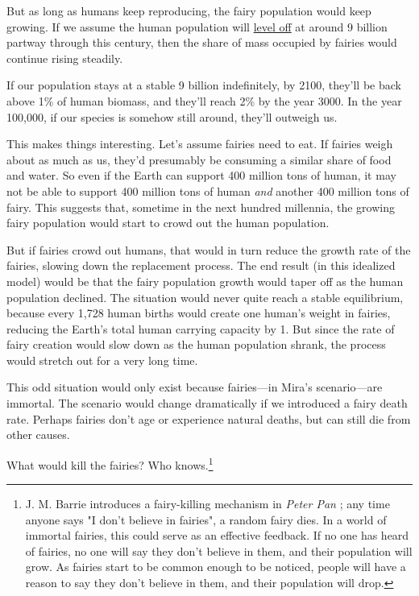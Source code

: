 {{But as long as humans keep reproducing, the fairy population would keep growing. If we assume the human population will \href{http://www.un.org/esa/population/publications/longrange2/WorldPop2300final.pdf}{level off} at around 9 billion partway through this century, then the share of mass occupied by fairies would continue rising steadily.}

{If our population stays at a stable 9 billion indefinitely, by 2100, they'll be back above 1\% of human biomass, and they'll reach 2\% by the year 3000. In the year 100,000, if our species is somehow still around, they'll outweigh us.}

{This makes things interesting. Let's assume fairies need to eat. If fairies weigh about as much as us, they'd presumably be consuming a similar share of food and water. So even if the Earth can support 400 million tons of human, it may not be able to support 400 million tons of human \emph{and} another 400 million tons of fairy. This suggests that, sometime in the next hundred millennia, the growing fairy population would start to crowd out the human population.}

{But if fairies crowd out humans, that would in turn reduce the growth rate of the fairies, slowing down the replacement process. The end result (in this idealized model) would be that the fairy population growth would taper off as the human population declined. The situation would never quite reach a stable equilibrium, because every 1,728 human births would create one human's weight in fairies, reducing the Earth's total human carrying capacity by 1. But since the rate of fairy creation would slow down as the human population shrank, the process would stretch out for a very long time.}

{This odd situation would only exist because fairies—in Mira's scenario—are immortal. The scenario would change dramatically if we introduced a fairy death rate. Perhaps fairies don't age or experience natural deaths, but can still die from other causes.}

{What would kill the fairies? Who knows.{\footnote{J. M. Barrie introduces a fairy-killing mechanism in \emph{Peter Pan} ; any time anyone says "I don't believe in fairies", a random fairy dies. In a world of immortal fairies, this could serve as an effective feedback. If no one has heard of fairies, no one will say they don't believe in them, and their population will grow. As fairies start to be common enough to be noticed, people will have a reason to say they don't believe in them, and their population will drop.

}}}}
